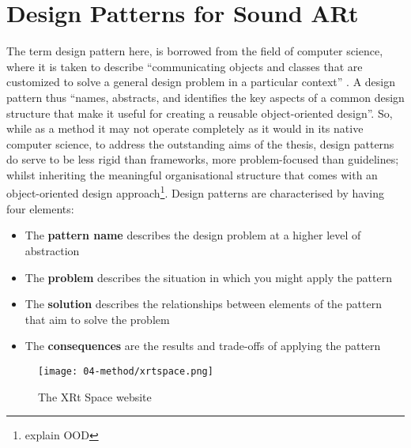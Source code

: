 \section{Design Patterns for Sound ARt} \label{sec: discussion-patterns}
The term design pattern here, is borrowed from the field of computer science, where it is taken to describe ``communicating objects and classes that are customized to solve a general design problem in a particular context'' \citep{gamma1995}. A design pattern thus ``names, abstracts, and identifies the key aspects of a common design structure that make it useful for creating a reusable object-oriented design''. So, while as a method it may not operate completely as it would in its native computer science, to address the outstanding aims of the thesis, design patterns do serve to be less rigid than frameworks, more problem-focused than guidelines; whilst inheriting the meaningful organisational structure that comes with an object-oriented design approach\footnote{explain OOD}. Design patterns are characterised by having four elements:
\begin{itemize}
    \item The \textbf{pattern name} describes the design problem at a higher level of abstraction
    \item The \textbf{problem} describes the situation in which you might apply the pattern
    \item The \textbf{solution} describes the relationships between elements of the pattern that aim to solve the problem
    \item The \textbf{consequences} are the results and trade-offs of applying the pattern
\end{itemize}

\begin{figure}
    \centering
    {\texttt{[image: 04-method/xrtspace.png]}}
    \caption[The XRt Space website]{The XRt Space website}
\end{figure}\label{fig: thexrtspace}

